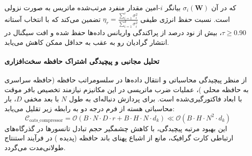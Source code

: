 که در آن $\sigma_i(\mathbf{W})$ بیانگر $i$-امین مقدار منفرد مرتب‌شده ماتریس به صورت نزولی است. نسبت حفظ انرژی طیفی $\eta_r = \frac{\sum_{i=1}^r \sigma_i^2}{\sum_{i=1}^{d} \sigma_i^2}$ تضمین می‌کند که با انتخاب آستانه $\tau \ge 0.90$، بیش از نود درصد از پراکندگی واریانس داده‌ها حفظ شده و افت سیگنال در انتشار گرادیان رو به عقب به حداقل ممکن کاهش می‌یابد.

\paragraph{تحلیل مجانبی و پیچیدگی اشتراک حافظه سخت‌افزاری}
از منظر پیچیدگی محاسباتی و انتقال داده‌ها در سلسومراتب حافظه (حافظه سراسری  به حافظه محلی )، عملیات ضرب ماتریسی در این مکانیزم نیازمند تخصیص بافر موقت با ابعاد فاکتورگیری‌شده است. برای پردازش دنباله‌ای به طول $N$ با بعد مخفی $D$، بار محاسباتی هسته از فرم درجه دو به رابطه زیر تقلیل می‌یابد:
\begin{equation}
\label{eq:complexity_oats_compressor}
\mathcal{C}_{\text{oats\_compressor}} = \mathcal{O}\left( B \cdot N \cdot D \cdot r + B \cdot H \cdot N \cdot d_k \right) \ll \mathcal{O}\left( B \cdot H \cdot N^2 \cdot d_k \right)
\end{equation}
این بهبود مرتبه پیچیدگی، با کاهش چشمگیر حجم تبادل تانسورها در گذرگاه‌های ارتباطی کارت گرافیک، مانع از اشباع پهنای باند حافظه (پدیده ) در فرآیند استنتاج طولانی‌مدت می‌گردد.
